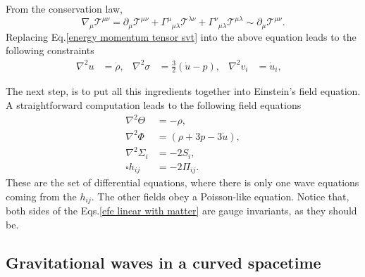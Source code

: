 \documentclass{article}
\begin{document}
From the conservation law, 
\begin{equation}
    \nabla_{\mu}\mathcal{T}^{\mu\nu} = \partial_{\mu}\mathcal{T}^{\mu\nu}
    + \Gamma^{\mu}{}_{\mu\lambda}\mathcal{T}^{\lambda\nu}
    + \Gamma^{\nu}{}_{\mu\lambda}\mathcal{T}^{\mu\lambda} \sim \partial_{\mu}\mathcal{T}^{\mu\nu}.
\end{equation}
Replacing Eq.\eqref{energy momentum tensor svt} into the above equation leads to the following
constraints
\begin{align}
    \nabla^{2}u & = \dot{\rho}, & 
    \nabla^{2}\sigma & = \frac{3}{2}\left(\dot{u} - p\right), & 
    \nabla^{2}v_{i} & = \dot{u}_{i}, & 
\end{align}

The next step, is to put all this ingredients together into Einstein's field equation. A 
straightforward computation leads to the following field equations
\begin{align}
    \label{efe linear with matter}
    \nabla^2 \Theta & = -\rho, \\
    \nabla^2 \Phi & = \left(\rho + 3p - 3\dot{u}\right), \\
    \nabla^2 \Sigma_{i} & = - 2S_{i}, \\
    \square h_{ij} & = -2\Pi_{ij}.
\end{align}
These are the set of differential equations, where there is only one wave equations coming
from the $h_{ij}$. The other fields obey a Poisson-like equation. Notice that, both sides of 
the Eqs.\eqref{efe linear with matter} are gauge invariants, as they should be.

\subsection{Gravitational waves in a curved spacetime}
\end{document}
